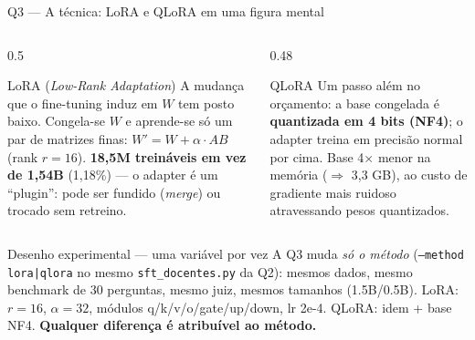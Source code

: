 \documentclass[10pt,aspectratio=169]{beamer}
\begin{document}
\begin{frame}{Q3 — A técnica: LoRA e QLoRA em uma figura mental}
  \begin{columns}[T]
    \begin{column}{0.5\textwidth}
      \begin{block}{LoRA (\emph{Low-Rank Adaptation})}
        \small A mudança que o fine-tuning induz em $W$ tem posto baixo. Congela-se $W$ e
        aprende-se só um par de matrizes finas: $W' = W + \alpha \cdot A B$ (rank $r{=}16$).
        \textbf{18,5M treináveis em vez de 1,54B} (1,18\%) — o adapter é um ``plugin'':
        pode ser fundido (\emph{merge}) ou trocado sem retreino.
      \end{block}
    \end{column}
    \begin{column}{0.48\textwidth}
      \begin{block}{QLoRA}
        \small Um passo além no orçamento: a base congelada é \textbf{quantizada em 4 bits (NF4)};
        o adapter treina em precisão normal por cima. Base 4$\times$ menor na memória
        ($\Rightarrow$ 3,3 GB), ao custo de gradiente mais ruidoso atravessando pesos quantizados.
      \end{block}
    \end{column}
  \end{columns}
  \vspace{6pt}
  \begin{block}{Desenho experimental — uma variável por vez}
    \small A Q3 muda \emph{só o método} (\texttt{--method lora|qlora} no mesmo
    \texttt{sft\_docentes.py} da Q2): mesmos dados, mesmo benchmark de 30 perguntas, mesmo juiz,
    mesmos tamanhos (1.5B/0.5B). LoRA: $r{=}16$, $\alpha{=}32$, módulos q/k/v/o/gate/up/down,
    lr 2e-4. QLoRA: idem + base NF4. \textbf{Qualquer diferença é atribuível ao método.}
  \end{block}
\end{frame}
\end{document}
